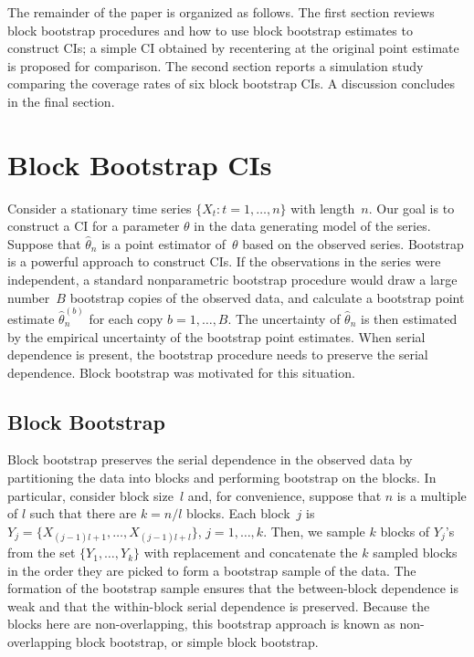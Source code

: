 \documentclass[10pt]{article}
\begin{document}
The remainder of the paper is organized as follows. The first section 
reviews block bootstrap procedures and how to use block bootstrap estimates to
construct CIs; a simple CI obtained by recentering at the original point 
estimate is proposed for comparison. The second section reports a simulation 
study comparing the coverage rates of six block bootstrap CIs. A discussion
concludes in the final section.

\section*{Block Bootstrap CIs}
\label{sec:bbci}

Consider a stationary time series $\{X_t: t = 1, \ldots, n\}$ with length~$n$. 
Our goal is to construct a CI for a parameter $\theta$ in the data generating 
model of the series. Suppose that $\hat\theta_n$ is a point estimator 
of~$\theta$ based on the observed series. Bootstrap is a powerful approach to
construct CIs. If the observations in the series were independent, a standard
nonparametric bootstrap procedure would draw a large number~$B$ bootstrap copies 
of the observed data, and calculate a bootstrap point estimate 
$\hat\theta_n^{(b)}$ for each copy $b = 1, \ldots, B$. The uncertainty of 
$\hat\theta_n$ is then estimated by the empirical uncertainty of the bootstrap 
point estimates. When serial dependence is present, the bootstrap procedure 
needs to preserve the serial dependence. Block bootstrap was motivated for this 
situation. 

\subsection*{Block Bootstrap}

Block bootstrap preserves the serial dependence in the observed data by 
partitioning the data into blocks and performing bootstrap on the blocks. In
particular, consider block size~$l$ and, for convenience, suppose that $n$ is a 
multiple of $l$ such that there are $k = n / l$ blocks. Each block~$j$ is
$Y_j = \{X_{(j - 1) l + 1}, \ldots, X_{(j - 1) l + l}\}$, $j = 1, \ldots, k$.
Then, we sample $k$ blocks of $Y_j$'s from the set $\{Y_1, \ldots, Y_k\}$ with
replacement and concatenate the $k$ sampled blocks in the order they are picked 
to form a bootstrap sample of the data. The formation of the bootstrap sample 
ensures that the between-block dependence is weak and that the within-block 
serial dependence is preserved. Because the blocks here are non-overlapping, 
this bootstrap approach is known as non-overlapping block bootstrap, or simple 
block bootstrap.
\end{document}
